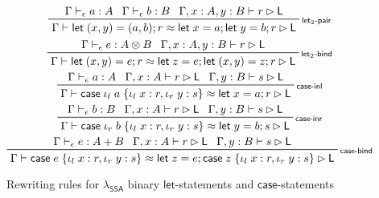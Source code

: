 \documentclass[acmsmall,screen,review]{acmart}
\newcommand{\ms}[1]{\ensuremath{\mathsf{#1}}}
\newcommand{\lto}{:}
\newcommand{\linl}[1]{\iota_l\;{#1}}
\newcommand{\linr}[1]{\iota_r\;{#1}}
\newcommand{\caseexpr}[5]{\ms{case}\;#1\;\{\linl{#2} \lto #3, \linr{#4} \lto #5\}}
\newcommand{\letstmt}[3]{\ensuremath{\ms{let}\;#1 = #2; #3}}
\newcommand{\bhyp}[2]{#1 : #2}
\newcommand{\rle}[1]{{\scriptsize\textsf{#1}}}
\newcommand{\hasty}[4]{#1 \vdash_{#2} #3: {#4}}
\newcommand{\haslb}[3]{#1 \vdash #2 \rhd #3}
\newcommand{\teqv}{\approx}
\newcommand{\lbeq}[4]{#1 \vdash #2 \teqv #3 \rhd {#4}}
\newcommand{\isotopessa}{\(\lambda_{\ms{SSA}}\)}
\begin{document}
\begin{figure}
  \begin{gather*}
    \prftree[r]{\rle{let$_2$-pair}}
      {\hasty{\Gamma}{\epsilon}{a}{A}}
      {\hasty{\Gamma}{\epsilon}{b}{B}}
      {\haslb{\Gamma, \bhyp{x}{A}, \bhyp{y}{B}}{r}{\ms{L}}}
      {\lbeq{\Gamma}{\letstmt{(x, y)}{(a, b)}{r}}{\letstmt{x}{a}{\letstmt{y}{b}{r}}}{\ms{L}}}
    \\
    \prftree[r]{\rle{let$_2$-bind}}
      {\hasty{\Gamma}{\epsilon}{e}{A \otimes B}}
      {\haslb{\Gamma, \bhyp{x}{A}, \bhyp{y}{B}}{r}{\ms{L}}}
      {\lbeq{\Gamma}{\letstmt{(x, y)}{e}{r}}{\letstmt{z}{e}{\letstmt{(x, y)}{z}{r}}}{\ms{L}}}
    \\
    \prftree[r]{\rle{case-inl}}
      {\hasty{\Gamma}{\epsilon}{a}{A}}
      {\haslb{\Gamma, \bhyp{x}{A}}{r}{\ms{L}}}
      {\haslb{\Gamma, \bhyp{y}{B}}{s}{\ms{L}}}
      {\lbeq{\Gamma}{\caseexpr{\linl{a}}{x}{r}{y}{s}}{\letstmt{x}{a}{r}}{\ms{L}}}
    \\
    \prftree[r]{\rle{case-inr}}
      {\hasty{\Gamma}{\epsilon}{b}{B}}
      {\haslb{\Gamma, \bhyp{x}{A}}{r}{\ms{L}}}
      {\haslb{\Gamma, \bhyp{y}{B}}{s}{\ms{L}}}
      {\lbeq{\Gamma}{\caseexpr{\linr{b}}{x}{r}{y}{s}}{\letstmt{y}{b}{s}}{\ms{L}}}
    \\
    \prftree[r]{\rle{case-bind}}
    {\hasty{\Gamma}{\epsilon}{e}{A + B}}
    {\haslb{\Gamma, \bhyp{x}{A}}{r}{\ms{L}}}
    {\haslb{\Gamma, \bhyp{y}{B}}{s}{\ms{L}}}
    {\lbeq{\Gamma}{\caseexpr{e}{x}{r}{y}{s}}{\letstmt{z}{e}{\caseexpr{z}{x}{r}{y}{s}}}{\ms{L}}}
  \end{gather*}
  \Description{}
  \caption{Rewriting rules for \isotopessa{} binary \ms{let}-statements and \ms{case}-statements}
  \label{fig:ssa-reg-let2-case-expr}
\end{figure}
\end{document}
